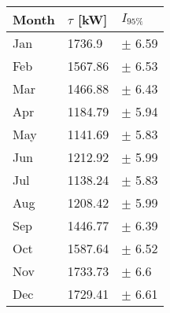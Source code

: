\begin{tabular}{lll}
\toprule
Month & $\tau$ [kW] &   $I_{95\%}$ \\
\midrule
  Jan &      1736.9 &   $\pm$ 6.59 \\
  Feb &     1567.86 &   $\pm$ 6.53 \\
  Mar &     1466.88 &   $\pm$ 6.43 \\
  Apr &     1184.79 &   $\pm$ 5.94 \\
  May &     1141.69 &   $\pm$ 5.83 \\
  Jun &     1212.92 &   $\pm$ 5.99 \\
  Jul &     1138.24 &   $\pm$ 5.83 \\
  Aug &     1208.42 &   $\pm$ 5.99 \\
  Sep &     1446.77 &   $\pm$ 6.39 \\
  Oct &     1587.64 &   $\pm$ 6.52 \\
  Nov &     1733.73 &    $\pm$ 6.6 \\
  Dec &     1729.41 &   $\pm$ 6.61 \\
\bottomrule
\end{tabular}
